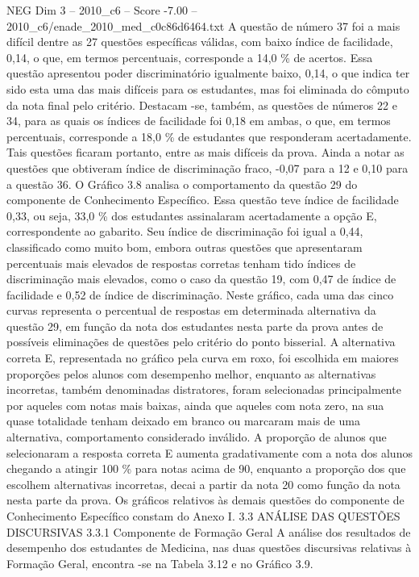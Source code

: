 \begin{textsample}{NEG Dim 3 – 2010\_c6 – Score -7.00 – 2010\_c6/enade\_2010\_med\_c0c86d6464.txt}
A questão de número 37 foi a mais difícil dentre as 27 questões específicas válidas, com baixo índice de facilidade, 0,14, o que, em termos percentuais, corresponde a 14,0 \% de acertos.
Essa questão apresentou poder discriminatório igualmente baixo, 0,14, o que indica ter sido esta uma das mais difíceis para os estudantes, mas foi eliminada do cômputo da nota final pelo critério.
Destacam -se, também, as questões de números 22 e 34, para as quais os índices de facilidade foi 0,18 em ambas, o que, em termos percentuais, corresponde a 18,0 \% de estudantes que responderam acertadamente.
Tais questões ficaram portanto, entre as mais difíceis da prova.
Ainda a notar as questões que obtiveram índice de discriminação fraco, -0,07 para a 12 e 0,10 para a questão 36.
O Gráfico 3.8 analisa o comportamento da questão 29 do componente de Conhecimento Específico.
Essa questão teve índice de facilidade 0,33, ou seja, 33,0 \% dos estudantes assinalaram acertadamente a opção E, correspondente ao gabarito.
Seu índice de discriminação foi igual a 0,44, classificado como muito bom, embora outras questões que apresentaram percentuais mais elevados de respostas corretas tenham tido índices de discriminação mais elevados, como o caso da questão 19, com 0,47 de índice de facilidade e 0,52 de índice de discriminação.
Neste gráfico, cada uma das cinco curvas representa o percentual de respostas em determinada alternativa da questão 29, em função da nota dos estudantes nesta parte da prova antes de possíveis eliminações de questões pelo critério do ponto bisserial.
A alternativa correta E, representada no gráfico pela curva em roxo, foi escolhida em maiores proporções pelos alunos com desempenho melhor, enquanto as alternativas incorretas, também denominadas distratores, foram selecionadas principalmente por aqueles com notas mais baixas, ainda que aqueles com nota zero, na sua quase totalidade tenham deixado em branco ou marcaram mais de uma alternativa, comportamento considerado inválido.
A proporção de alunos que selecionaram a resposta correta E aumenta gradativamente com a nota dos alunos chegando a atingir 100 \% para notas acima de 90, enquanto a proporção dos que escolhem alternativas incorretas, decai a partir da nota 20 como função da nota nesta parte da prova.
Os gráficos relativos às demais questões do componente de Conhecimento Específico constam do Anexo I. 3.3 ANÁLISE DAS QUESTÕES DISCURSIVAS 3.3.1 Componente de Formação Geral A análise dos resultados de desempenho dos estudantes de Medicina, nas duas questões discursivas relativas à Formação Geral, encontra -se na Tabela 3.12 e no Gráfico 3.9.

\end{textsample}
